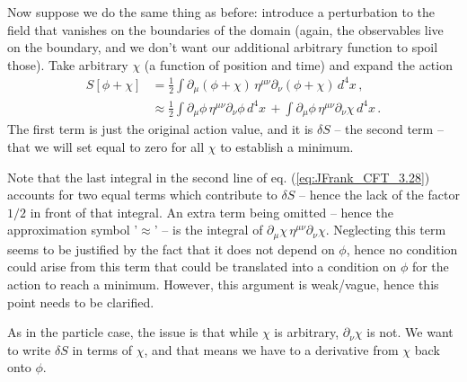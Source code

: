 Now suppose we do the same thing as before: introduce a perturbation to the field that vanishes on the boundaries of the domain (again, the observables live on the boundary, and we don't want our additional arbitrary function to spoil those). Take arbitrary $\chi$ (a function of position and time) and expand the action
\begin{equation}\label{eq:JFrank_CFT_3.28}
\begin{aligned}
S[\phi + \chi]  & = \frac{1}{2} \int{\partial_\mu (\phi + \chi) \,\eta^{\mu \nu} \partial_\nu (\phi + \chi) } \,d^4x\,, \\ 
                & \approx \frac{1}{2} \int{\partial_\mu \phi\,\eta^{\mu \nu} \partial_\nu \phi } \,d^4x\, +  \int{\partial_\mu \phi\,\eta^{\mu \nu} \partial_\nu \chi } \,d^4x\,.
\end{aligned}
\end{equation}
The first term is just the original action value, and it is $\delta S$ -- the second term -- that we will set equal to zero for all $\chi$ to establish a minimum. 

\parindent=0pt  %
\parbox{\textwidth}{\begin{mdframed}[style=MyFrame] %
Note that the last integral in the second line of eq. (\ref{eq:JFrank_CFT_3.28}) accounts for two equal terms which contribute to $\delta S$ -- hence the lack of the factor $1/2$ in front of that integral. 
An extra term being omitted -- hence the approximation symbol '$\approx$' --  is the integral of $\partial_\mu \chi\,\eta^{\mu \nu} \partial_\nu \chi$. Neglecting this term seems to be justified by the fact that it does not depend on $\phi$, hence no condition could arise from this term that could be translated into a condition on $\phi$ for the action to reach a minimum. However, this argument is weak/vague, hence this point needs to be clarified. 
\end{mdframed}} %
\parindent=10pt %

As in the particle case, the issue is that while $\chi$ is arbitrary, $\partial_\nu \chi$ is not. We want to write $\delta S$ in terms of $\chi$, and that means we have to  a derivative from $\chi$ back onto $\phi$. 

